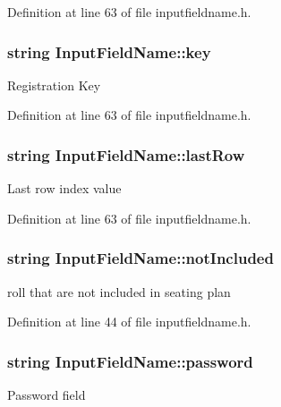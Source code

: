 \-Definition at line 63 of file inputfieldname.\-h.

\hypertarget{classInputFieldName_a26cffcb455cb1b977aa60b68c5b48fe4}{
\subsubsection[{key}]{\setlength{\rightskip}{0pt plus 5cm}string {\bf \-Input\-Field\-Name\-::key}}}\label{classInputFieldName_a26cffcb455cb1b977aa60b68c5b48fe4}
\-Registration \-Key 

\-Definition at line 63 of file inputfieldname.\-h.

\hypertarget{classInputFieldName_a12e0f0ec0ad7962271d6dae576e5ee0a}{
\subsubsection[{last\-Row}]{\setlength{\rightskip}{0pt plus 5cm}string {\bf \-Input\-Field\-Name\-::last\-Row}}}\label{classInputFieldName_a12e0f0ec0ad7962271d6dae576e5ee0a}
\-Last row index value 

\-Definition at line 63 of file inputfieldname.\-h.

\hypertarget{classInputFieldName_a9ee6ee84737e1199bdfd9fb24c82c2c7}{
\subsubsection[{not\-Included}]{\setlength{\rightskip}{0pt plus 5cm}string {\bf \-Input\-Field\-Name\-::not\-Included}}}\label{classInputFieldName_a9ee6ee84737e1199bdfd9fb24c82c2c7}
roll that are not included in seating plan 

\-Definition at line 44 of file inputfieldname.\-h.

\hypertarget{classInputFieldName_a318f819ef4663d7e5f40d91180093cb9}{
\subsubsection[{password}]{\setlength{\rightskip}{0pt plus 5cm}string {\bf \-Input\-Field\-Name\-::password}}}\label{classInputFieldName_a318f819ef4663d7e5f40d91180093cb9}
\-Password field 

